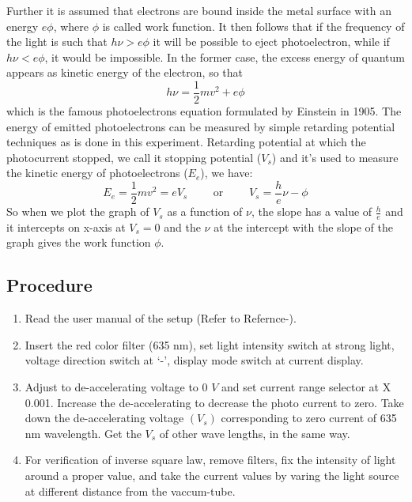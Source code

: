 \documentclass[%
 sor,
 jor,
 amsmath,amssymb,
 reprint,%
]{revtex4-2}
\begin{document}
Further it is assumed that electrons are bound inside the metal surface with an energy $e\phi$, where $\phi$ is called work function. It then follows that if the frequency of the light is such that $h\nu > e \phi$ it will be possible to eject photoelectron, while if $h\nu < e \phi$, it would be impossible. In the former case, the excess energy of quantum appears as kinetic energy of the electron, so that \begin{equation}h\nu = \frac 1 2 mv^2 + e\phi \end{equation} which is the famous photoelectrons equation formulated by Einstein in 1905. The energy of emitted photoelectrons can be measured by simple retarding potential techniques as is done in this experiment.
Retarding potential at which the photocurrent stopped, we call it stopping potential ($V_s$) and it's used to measure the kinetic energy of photoelectrons ($E_e$), we have: 
\begin{equation}E_e = \frac 1 2 mv^2 = eV_s \,\,\,\,\,\,\,\,\,\,\,\,\,\,  \text{or} \,\,\,\,\,\,\,\,\,\,\,\,\,\, V_s = \frac h e \nu-\phi \end{equation}
So when we plot the graph of $V_s$ as a function of $\nu$, the slope has a value of $\frac h e $ and it intercepts on x-axis at $V_s = 0$ and the $\nu$ at the intercept with the slope of the graph gives the work function $\phi$.


\subsection{Procedure}

\begin{enumerate}
	\item Read the user manual of the setup (Refer to Refernce-\cite{fsu_manual}).
  \item Insert the red color filter (635 nm), set light intensity switch at strong light, voltage direction switch at `-', display mode switch at current display.
  \item Adjust to de-accelerating voltage to 0 $V$  and set current range selector at X 0.001. Increase the de-accelerating to decrease the photo current to zero. Take down the de-accelerating voltage $(V_s)$ corresponding to zero current of 635 nm wavelength. Get the $V_s$ of other wave lengths, in the same way.
  \item For verification of inverse square law, remove filters, fix the intensity of light around a proper value, and take the current values by varing the light source at different distance from the vaccum-tube.
\end{enumerate}
\end{document}
